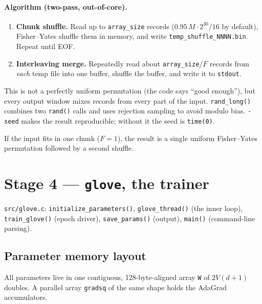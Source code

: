 \documentclass[11pt,a4paper]{article}
\newcommand{\file}[1]{\texttt{#1}}
\newcommand{\fn}[1]{\texttt{#1()}}
\newcommand{\opt}[1]{\texttt{-#1}}
\begin{document}
\paragraph{Algorithm (two-pass, out-of-core).}
\begin{enumerate}[nosep]
  \item \textbf{Chunk shuffle.} Read up to \texttt{array\_size} records
        ($0.95\,M\cdot2^{30}/16$ by default), Fisher--Yates shuffle them in memory, and write
        \file{temp\_shuffle\_NNNN.bin}. Repeat until EOF.
  \item \textbf{Interleaving merge.} Repeatedly read about \texttt{array\_size}/$F$ records
        from \emph{each} temp file into one buffer, shuffle the buffer, and write it to
        \texttt{stdout}.
\end{enumerate}
This is not a perfectly uniform permutation (the code says ``good enough''), but every
output window mixes records from every part of the input. \fn{rand\_long} combines two
\fn{rand} calls and uses rejection sampling to avoid modulo bias. \opt{seed} makes the
result reproducible; without it the seed is \texttt{time(0)}.

If the input fits in one chunk ($F=1$), the result is a single uniform Fisher--Yates
permutation followed by a second shuffle.

\section{Stage 4 --- \texttt{glove}, the trainer}

\begin{codeloc}
\file{src/glove.c}: \fn{initialize\_parameters}, \fn{glove\_thread} (the inner loop),
\fn{train\_glove} (epoch driver), \fn{save\_params} (output), \fn{main} (command-line parsing).
\end{codeloc}

\subsection{Parameter memory layout}

All parameters live in one contiguous, 128-byte-aligned array \texttt{W} of
$2V(d+1)$ doubles. A parallel array \texttt{gradsq} of the same shape holds the AdaGrad
accumulators.
\end{document}
